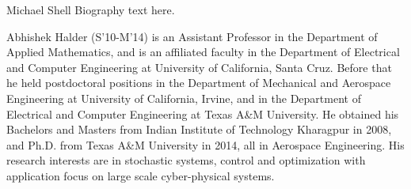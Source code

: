 \documentclass[10pt,twocolumn]{IEEEtran}
\begin{document}
\begin{IEEEbiography}{Michael Shell}
Biography text here.
\end{IEEEbiography}



\begin{IEEEbiography}{Abhishek
Halder}
(S'10-M'14) is an Assistant Professor in the Department of Applied Mathematics,
and is an affiliated faculty in the Department of Electrical and Computer Engineering at
University of California, Santa Cruz. Before that he held postdoctoral
positions in the Department of Mechanical and Aerospace Engineering at
University of California, Irvine, and in the Department of Electrical
and Computer Engineering at Texas A\&M University. He obtained his
Bachelors and Masters from Indian Institute of Technology Kharagpur in
2008, and Ph.D. from Texas A\&M University in 2014, all in Aerospace
Engineering. His research interests are in stochastic systems, control
and optimization with application focus on large scale cyber-physical
systems.
\end{IEEEbiography}






\end{document}
